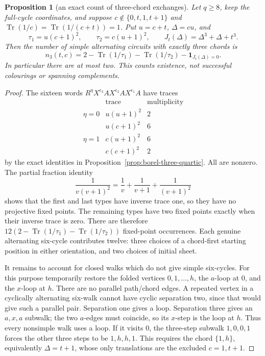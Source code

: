 \documentclass[11pt,a4paper]{article}
\newtheorem{proposition}[theorem]{Proposition}
\theoremstyle{definition}
\theoremstyle{remark}
\begin{document}
\begin{proposition}[an exact count of three-chord exchanges]\label{prop:borel-three-count}
Let $q\ge8$, keep the full-cycle coordinates, and suppose
$c\notin\{0,t,1,t+1\}$ and $\operatorname{Tr}(1/c)=\operatorname{Tr}(1/(c+t))=1$.
Put $u=c+t$, $\Delta=cu$, and
\[
 \tau_1=u(c+1)^2,\qquad \tau_2=c(u+1)^2,\qquad
 J_t(\Delta)=\Delta^3+\Delta+t^3.
\]
Then the number of simple alternating circuits with exactly three chords is
\[
 n_3(t,c)=2-\operatorname{Tr}(1/\tau_1)-\operatorname{Tr}(1/\tau_2)
                  -\mathbf1_{J_t(\Delta)=0}.
\]
In particular there are at most two.  This counts existence, not successful colourings or spanning complements.
\end{proposition}
\begin{proof}
The sixteen words $R^\eta X^{\epsilon_3}AX^{\epsilon_2}AX^{\epsilon_1}A$ have traces
\[
\begin{array}{c|cc}
 &\text{trace}&\text{multiplicity}\\\hline
\eta=0&u(u+1)^2&2\\
       &u(c+1)^2&6\\
\eta=1&c(u+1)^2&6\\
       &c(c+1)^2&2
\end{array}
\]
by the exact identities in Proposition~\ref{prop:borel-three-quartic}.  All are nonzero.  The partial fraction identity
\[
 \frac1{v(v+1)^2}=\frac1v+\frac1{v+1}+\frac1{(v+1)^2}
\]
shows that the first and last types have inverse trace one, so they have no projective fixed points.  The remaining types have two fixed points exactly when their inverse trace is zero.  There are therefore
$12(2-\operatorname{Tr}(1/\tau_1)-\operatorname{Tr}(1/\tau_2))$ fixed-point occurrences.  Each genuine alternating six-cycle contributes twelve: three choices of a chord-first starting position in either orientation, and two choices of initial sheet.

It remains to account for closed walks which do not give simple six-cycles.  For this purpose temporarily restore the folded vertices $0,1,\ldots,h$, the $a$-loop at $0$, and the $x$-loop at $h$.  There are no parallel path/chord edges.  A repeated vertex in a cyclically alternating six-walk cannot have cyclic separation two, since that would give such a parallel pair.  Separation one gives a loop.  Separation three gives an $a,x,a$ subwalk; the two $a$-edges must coincide, so its $x$-step is the loop at $h$.  Thus every nonsimple walk uses a loop.  If it visits $0$, the three-step subwalk $1,0,0,1$ forces the other three steps to be $1,h,h,1$.  This requires the chord $\{1,h\}$, equivalently $\Delta=t+1$, whose only translations are the excluded $c=1,t+1$.


\end{proof}
\end{document}
